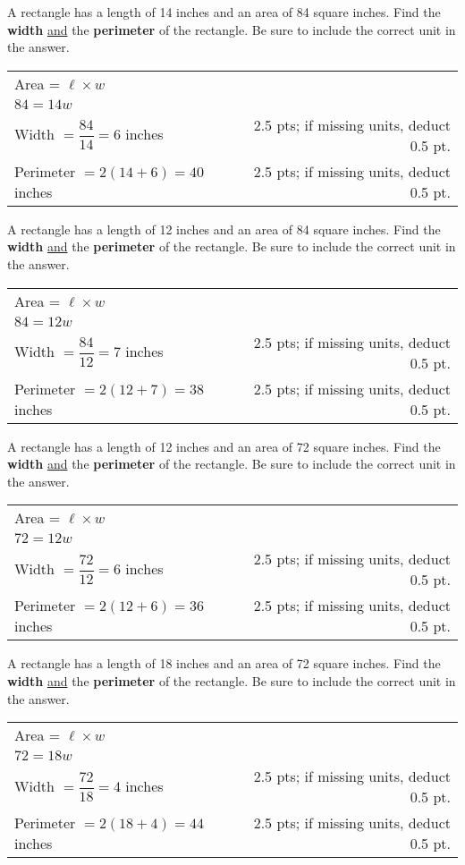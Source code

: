 {
	A rectangle has a length of 14 inches and an area of 84 square inches. Find the {\bf width} \underline{and} the {\bf perimeter} of the rectangle.  Be sure to include the correct unit in the answer.
}
{
	\begin{tabular}{l r}
	Area = $\ell \times w $ \\  
	$84=14w$\\
	Width $=\dfrac{84}{14}=6$ inches  & 2.5 pts; if missing units, deduct 0.5 pt. \\ 
	Perimeter $=2(14+6)=40$ inches&2.5 pts; if missing units, deduct 0.5 pt.
	\end{tabular}
}

{
	A rectangle has a length of 12 inches and an area of 84 square inches. Find the {\bf width} \underline{and} the {\bf perimeter} of the rectangle.  Be sure to include the correct unit in the answer.
}
{
	\begin{tabular}{l r}
	Area = $\ell \times w $ \\  
	$84=12w$\\
	Width $=\dfrac{84}{12}=7$ inches  & 2.5 pts; if missing units, deduct 0.5 pt. \\ 
	Perimeter $=2(12+7)=38$ inches&2.5 pts; if missing units, deduct 0.5 pt.
	\end{tabular}
}

{
	A rectangle has a length of 12 inches and an area of 72 square inches. Find the {\bf width} \underline{and} the {\bf perimeter} of the rectangle.  Be sure to include the correct unit in the answer.
}
{
	\begin{tabular}{l r}
	Area = $\ell \times w $ \\  
	$72=12w$\\
	Width $=\dfrac{72}{12}=6$ inches  & 2.5 pts; if missing units, deduct 0.5 pt. \\ 
	Perimeter $=2(12+6)=36$ inches&2.5 pts; if missing units, deduct 0.5 pt.
	\end{tabular}
}

{
	A rectangle has a length of 18 inches and an area of 72 square inches. Find the {\bf width} \underline{and} the {\bf perimeter} of the rectangle.  Be sure to include the correct unit in the answer.
}
{
	\begin{tabular}{l r}
	Area = $\ell \times w $ \\  
	$72=18w$\\
	Width $=\dfrac{72}{18}=4$ inches  & 2.5 pts; if missing units, deduct 0.5 pt. \\ 
	Perimeter $=2(18+4)=44$ inches&2.5 pts; if missing units, deduct 0.5 pt.
	\end{tabular}
}
